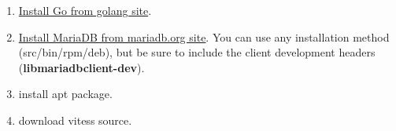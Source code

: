\begin{enumerate}
\item \href{http://golang.org/doc/install}{Install Go from golang site}.
\item \href{https://downloads.mariadb.org/}{Install MariaDB from mariadb.org site}.
You can use any installation method (src/bin/rpm/deb),
but be sure to include the client development headers (\textbf{libmariadbclient-dev}).

\item install apt package.
% 

\item download vitess source.


\end{enumerate}
